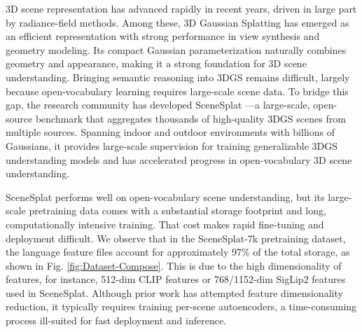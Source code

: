 \documentclass[10pt,twocolumn,letterpaper]{article}
\begin{document}
3D scene representation has advanced rapidly in recent years, driven in large part by radiance-field methods. Among these, 3D Gaussian Splatting \cite{kerbl3Dgaussians} has emerged as an efficient representation with strong performance in view synthesis and geometry modeling. Its compact Gaussian parameterization naturally combines geometry and appearance, making it a strong foundation for 3D scene understanding.
Bringing semantic reasoning into 3DGS remains difficult, largely because open-vocabulary learning requires large-scale scene data. To bridge this gap, the research community has developed SceneSplat \cite{li2025scenesplat,ma2025scenesplatpp}---a large-scale, open-source benchmark that aggregates thousands of high-quality 3DGS scenes from multiple sources. Spanning indoor and outdoor environments with billions of Gaussians, it provides large-scale supervision for training generalizable 3DGS understanding models and has accelerated progress in open-vocabulary 3D scene understanding.

SceneSplat performs well on open-vocabulary scene understanding, but its large-scale pretraining data comes with a substantial storage footprint and long, computationally intensive training. That cost makes rapid fine-tuning and deployment difficult. We observe that in the SceneSplat-7k pretraining dataset, the language feature files account for approximately 97\% of the total storage, as shown in Fig. \ref{fig:Dataset-Compose}. This is due to the high dimensionality of features, for instance, 512-dim CLIP \cite{radford2021learning} features or 768/1152-dim SigLip2 \cite{tschannen2025siglip} features used in SceneSplat. Although prior work has attempted feature dimensionality reduction, it typically requires training per-scene autoencoders, a time-consuming process ill-suited for fast deployment and inference.
\end{document}
